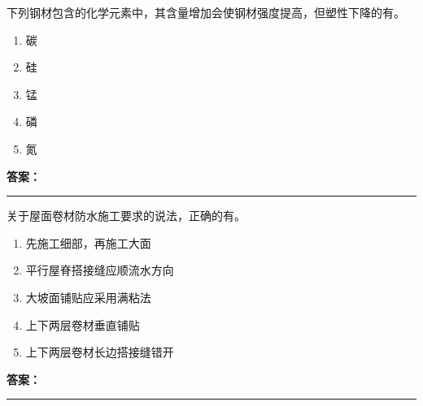 \documentclass[UTF8,fontset=fandol,11pt]{ctexart}
\newcommand{\answerline}{\textcolor{answerred}{\rule{2.4cm}{0.7pt}}}
\begin{document}
\begin{quizbox}[title={乱序第 181 题｜第四章混凝土结构工程}]

下列钢材包含的化学元素中，其含量增加会使钢材强度提高，但塑性下降的有。\\

\begin{enumerate}[label=\Alph*.]

\item 碳

\item 硅

\item 锰

\item 磷

\item 氮

\end{enumerate}

\textbf{\textcolor{answerred}{答案：}} \answerline

\end{quizbox}

\vspace{0.2em}

\begin{quizbox}[title={乱序第 182 题｜第九章防水工程}]

关于屋面卷材防水施工要求的说法，正确的有。\\

\begin{enumerate}[label=\Alph*.]

\item 先施工细部，再施工大面

\item 平行屋脊搭接缝应顺流水方向

\item 大坡面铺贴应采用满粘法

\item 上下两层卷材垂直铺贴

\item 上下两层卷材长边搭接缝错开

\end{enumerate}

\textbf{\textcolor{answerred}{答案：}} \answerline

\end{quizbox}

\vspace{0.2em}
\end{document}
